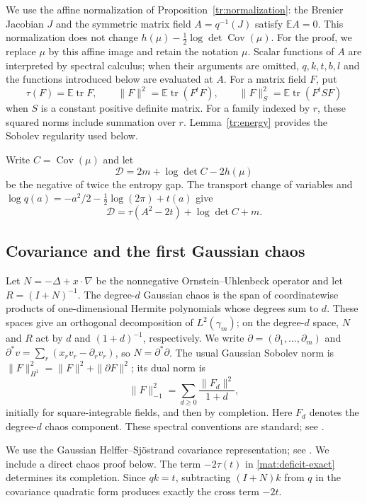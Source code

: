 \documentclass[11pt]{article}
\newcommand{\mathscr}[1]{\mathcal{#1}}
\newcommand{\E}{\mathbb E}
\DeclareMathOperator{\tr}{tr}
\DeclareMathOperator{\Cov}{Cov}
\newcommand{\Id}{I}
\theoremstyle{definition}
\theoremstyle{remark}
\numberwithin{equation}{section}
\begin{document}
We use the affine normalization of
Proposition~\ref{tr:normalization}: the Brenier Jacobian $J$ and the
symmetric matrix field $A=q^{-1}(J)$ satisfy $\E A=0$.  This normalization
does not change $h(\mu)-\frac12\log\det\Cov(\mu)$.  For the proof,
we replace $\mu$ by this affine image and retain the notation $\mu$.
Scalar functions of $A$
are interpreted by spectral calculus; when their arguments are omitted,
$q,k,t,b,l$ and the functions introduced below are evaluated at $A$.  For a matrix field $F$, put
\[
 \tau(F)=\E\tr F,\qquad
 \|F\|^2=\E\tr(F^tF),\qquad
 \|F\|_S^2=\E\tr(F^tSF)
\]
when $S$ is a constant positive definite matrix.  For a family indexed
by $r$, these squared norms include summation over $r$.  Lemma~\ref{tr:energy}
provides the Sobolev regularity used below.

Write $C=\Cov(\mu)$ and let
\[
 \mathscr D=2m+\log\det C-2h(\mu)
\]
be the negative of twice the entropy gap.  The transport change of variables and
$\log q(a)=-a^2/2-\frac12\log(2\pi)+t(a)$ give
\begin{equation}\label{mat:deficit-exact}
 \mathscr D=\tau(A^2-2t)+\log\det C+m.
\end{equation}

\subsection{Covariance and the first Gaussian chaos}

Let $N=-\Delta+x\cdot\nabla$ be the nonnegative Ornstein--Uhlenbeck
operator and let $R=(\Id+N)^{-1}$.  The degree-$d$ Gaussian chaos is
the span of coordinatewise products of one-dimensional Hermite polynomials whose
degrees sum to $d$.  These spaces give an orthogonal decomposition of
$L^2(\gamma_m)$; on the degree-$d$ space, $N$ and $R$ act by $d$ and
$(1+d)^{-1}$, respectively.
We write $\partial=(\partial_1,\ldots,\partial_m)$ and
$\partial^*v=\sum_r(x_rv_r-\partial_rv_r)$, so $N=\partial^*\partial$.
The usual Gaussian Sobolev norm is
$\|F\|_{H^1}^2=\|F\|^2+\|\partial F\|^2$; its dual norm is
\[
 \|F\|_{-1}^2=\sum_{d\ge0}\frac{\|F_d\|^2}{1+d},
\]
initially for square-integrable fields, and then by completion.
Here $F_d$ denotes the degree-$d$ chaos component.  These spectral
conventions are standard; see \cite[Section~2]{NourdinPeccati2009}.

We use the Gaussian Helffer--Sj\"ostrand covariance representation;
see \cite[Proposition~4.1(ii)]{DuerinckxOtto2020}.  We include a direct
chaos proof below.  The term $-2\tau(t)$ in \eqref{mat:deficit-exact}
determines its completion.  Since $qk=t$, subtracting $(\Id+N)k$ from
$q$ in the covariance quadratic form produces exactly the cross term
$-2t$.
\end{document}
